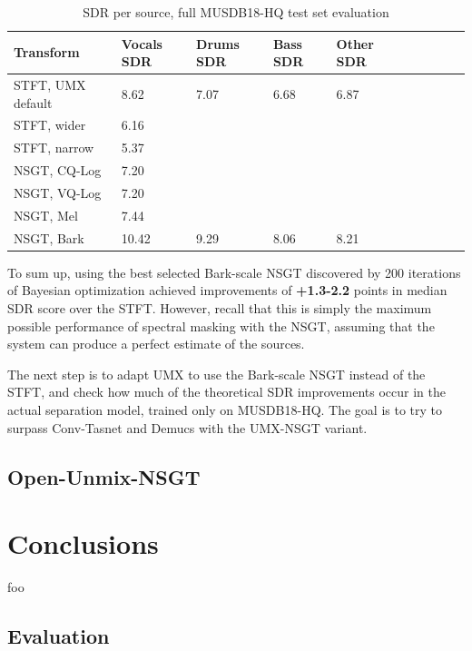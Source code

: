 \documentclass[letter,12pt,notitlepage]{article}
\begin{document}
\begin{table}[ht]
	\centering
\begin{tabular}{ |l|l|l|l|l|c|c|c|c|c| }
	 \hline
	  Transform & Vocals SDR & Drums SDR & Bass SDR & Other SDR \\
	 \hline
	 \hline
	 STFT, UMX default & 8.62 & 7.07 & 6.68 & 6.87 \\
	 \hline
	 STFT, wider & 6.16 \\
	 \hline
	 STFT, narrow & 5.37 \\
	 \hline
	 NSGT, CQ-Log & 7.20 \\
	 \hline
	 NSGT, VQ-Log & 7.20 \\
	 \hline
	 NSGT, Mel & 7.44 \\
	 \hline
	 NSGT, Bark & 10.42 & 9.29 & 8.06 & 8.21 \\
	 \hline
\end{tabular}
	\caption{SDR per source, full MUSDB18-HQ test set evaluation}
	\label{table:nsgtbayesresults2}
\end{table}

To sum up, using the best selected Bark-scale NSGT discovered by 200 iterations of Bayesian optimization achieved improvements of \textbf{+1.3-2.2}  points in median SDR score over the STFT. However, recall that this is simply the maximum possible performance of spectral masking with the NSGT, assuming that the system can produce a perfect estimate of the sources.

The next step is to adapt UMX to use the Bark-scale NSGT instead of the STFT, and check how much of the theoretical SDR improvements occur in the actual separation model, trained only on MUSDB18-HQ. The goal is to try to surpass Conv-Tasnet and Demucs with the UMX-NSGT variant.

\subsection{Open-Unmix-NSGT}


\vfill
\clearpage
\section{Conclusions}
\label{sec:conclusion}

foo

\subsection{Evaluation}
\end{document}
